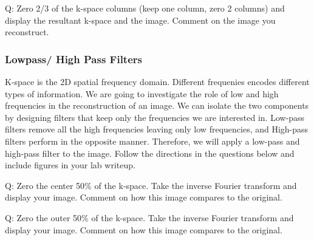 \noindent{}\color{red}Q: Zero 2/3 of the k-space columns (keep one column, zero 2 columns) and display the resultant k-space and the image. Comment on the image you reconstruct.
\color{black}

\subsubsection{Lowpass/ High Pass Filters}
K-space is the 2D spatial frequency domain. Different frequenies encodes different types of information. We are going to investigate the role of low and high frequencies in the reconstruction of an image. We can isolate the two components by designing filters that keep only the frequencies we are interested in. Low-pass filters remove all the high frequencies leaving only low frequencies, and High-pass filters perform in the opposite manner. Therefore, we will apply a low-pass and high-pass filter to the image. Follow the directions in the questions below and include figures in your lab writeup. 
  
\vspace{5mm} 

\noindent{}\color{red}Q: Zero the center 50\% of the k-space. Take the inverse Fourier transform and display your image. Comment on how this image compares to the original. 
\color{black}

\vspace{5mm} 

\noindent{}\color{red}Q: Zero the outer 50\% of the k-space. Take the inverse Fourier transform and display your image. Comment on how this image compares to the original. 
\color{black}

\vspace{5mm} 
